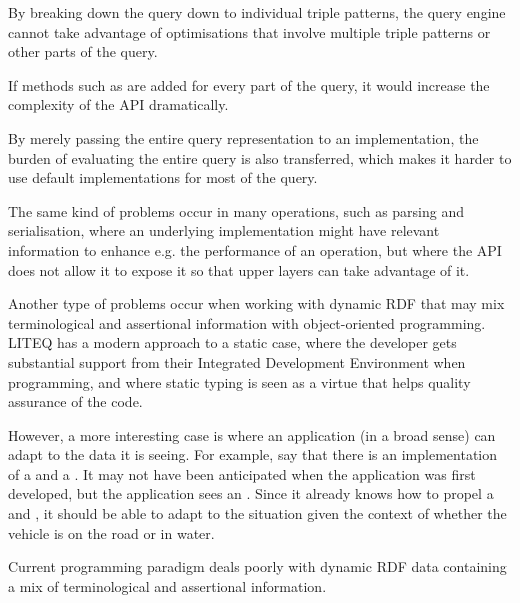 \begin{problem}\label{prob:breakdown}
By breaking down the query down to individual triple patterns, the
query engine cannot take advantage of optimisations that involve
multiple triple patterns or other parts of the query.
\end{problem}

\begin{problem}\label{prob:complexapi}
If methods such as  are added for every part of the
query, it would increase the complexity of the API dramatically.
\end{problem}

\begin{problem}\label{prob:dontjustpass}
By merely passing the entire query representation to an
implementation, the burden of evaluating the entire query is also
transferred, which makes it harder to use default implementations for
most of the query.
\end{problem}

The same kind of problems occur in many operations, such as parsing
and serialisation, where an underlying implementation might have
relevant information to enhance e.g. the performance of an operation,
but where the API does not allow it to expose it so that upper layers
can take advantage of it.

Another type of problems occur when working with dynamic RDF that may
mix terminological and assertional information with object-oriented
programming. LITEQ \cite{leinberger2014semantic} has a modern approach
to a static case, where the developer gets substantial support from
their Integrated Development Environment when programming, and where
static typing is seen as a virtue that helps quality assurance of the
code.

However, a more interesting case is where an application (in a broad
sense) can adapt to the data it is seeing. For example, say that there
is an implementation of a  and a . It may
not have been anticipated when the application was first developed,
but the application sees an . Since it
already knows how to propel a  and , it
should be able to adapt to the situation given the context of whether
the vehicle is on the road or in water.

\begin{problem}\label{prob:dynaprog}
Current programming paradigm deals poorly with dynamic RDF data
containing a mix of terminological and assertional information.
\end{problem}


